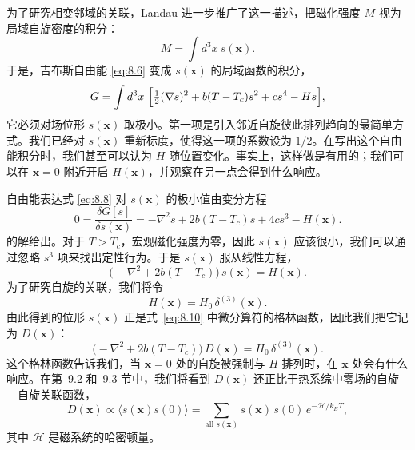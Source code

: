 为了研究相变邻域的关联，Landau 进一步推广了这一描述，把磁化强度 $M$ 视为局域自旋密度的积分：
\begin{equation}
  M = \int d^3x\ s(\mathbf{x}) .
  \label{eq:8.7}
\end{equation}
于是，吉布斯自由能 \eqref{eq:8.6} 变成 $s(\mathbf{x})$ 的局域函数的积分，
\begin{equation}
  G = \int d^3x\ \Bigl[ \tfrac{1}{2}(\nabla s)^2 + b(T-T_c)s^2 + cs^4 - Hs
    \Bigr],
  \label{eq:8.8}
\end{equation}
它必须对场位形 $s(\mathbf{x})$ 取极小。第一项是引入邻近自旋彼此排列趋向的最简单方式。我们已经对 $s(\mathbf{x})$ 重新标度，使得这一项的系数设为 $1/2$。在写出这个自由能积分时，我们甚至可以认为 $H$ 随位置变化。事实上，这样做是有用的；我们可以在 $\mathbf{x} = 0$ 附近开启 $H(\mathbf{x})$，并观察在另一点会得到什么响应。

自由能表达式 \eqref{eq:8.8} 对 $s(\mathbf{x})$ 的极小值由变分方程
\begin{equation}
  0 = \frac{\delta G[s]}{\delta s(\mathbf{x})} = -\nabla^2 s + 2b(T-T_c)s
    + 4cs^3 - H(\mathbf{x}) .
  \label{eq:8.9}
\end{equation}
的解给出。对于 $T > T_c$，宏观磁化强度为零，因此 $s(\mathbf{x})$ 应该很小，我们可以通过忽略 $s^3$ 项来找出定性行为。于是 $s(\mathbf{x})$ 服从线性方程，
\begin{equation}
  \bigl( -\nabla^2 + 2b(T-T_c) \bigr)\,s(\mathbf{x}) = H(\mathbf{x}) .
  \label{eq:8.10}
\end{equation}
为了研究自旋的关联，我们将令
\begin{equation}
  H(\mathbf{x}) = H_0\,\delta^{(3)}(\mathbf{x}) .
  \label{eq:8.11}
\end{equation}
由此得到的位形 $s(\mathbf{x})$ 正是式~\eqref{eq:8.10} 中微分算符的格林函数，因此我们把它记为 $D(\mathbf{x})$：
\begin{equation}
  \bigl( -\nabla^2 + 2b(T-T_c) \bigr)\,D(\mathbf{x}) = H_0\,\delta^{(3)}(\mathbf{x}).
  \label{eq:8.12}
\end{equation}
这个格林函数告诉我们，当 $\mathbf{x} = 0$ 处的自旋被强制与 $H$ 排列时，在 $\mathbf{x}$ 处会有什么响应。在第~9.2 和~9.3 节中，我们将看到 $D(\mathbf{x})$ 还正比于热系综中零场的自旋—自旋关联函数，
\begin{equation}
  D(\mathbf{x}) \propto \langle s(\mathbf{x})s(0)\rangle
  = \sum_{\text{all } s(\mathbf{x})} s(\mathbf{x})\,s(0)\,
    e^{-\mathcal{H}/k_BT} ,
  \label{eq:8.13}
\end{equation}
其中 $\mathcal{H}$ 是磁系统的哈密顿量。

